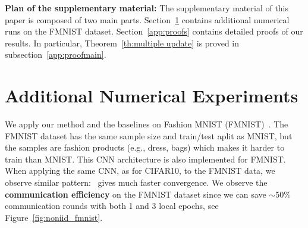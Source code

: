 \documentclass[twoside]{article}
\begin{document}






\clearpage

 \appendix 


 \onecolumn

   \hsize\textwidth
   \linewidth{}
 
  \vspace{0.5in}
 
 
 \textbf{Plan of the supplementary material:}
 The supplementary material of this paper is composed of two main parts.
 Section~\ref{app:numericals} contains additional numerical runs on the FMNIST dataset.
 Section~\ref{app:proofs} contains detailed proofs of our results.
 In particular, Theorem~\ref{th:multiple update} is proved in subsection~\ref{app:proofmain}.



\section{Additional Numerical Experiments}\label{app:numericals}

We apply our method and the baselines on Fashion MNIST (FMNIST)~\citep{fmnist}.
The FMNIST dataset has the same sample size and train/test aplit as MNIST, but the samples are fashion products (e.g., dress, bags) which makes it harder to train than MNIST. 
This CNN architecture is also implemented for FMNIST. 
When applying the same CNN, as for CIFAR10, to the FMNIST data, we observe similar pattern: \algo\ gives much faster convergence. 
We observe the \textbf{communication efficiency} on the FMNIST dataset since we can save $\sim$50\% communication rounds with both 1 and 3 local epochs, see Figure~\ref{fig:noniid_fmnist}.
\end{document}
